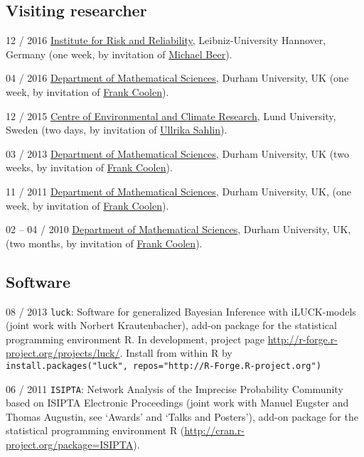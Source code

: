 \documentclass[a4paper]{simplecv}
\begin{document}
\subsection{Visiting researcher}
\begin{topic}
\item[12 / 2016] \href{https://www.irz.uni-hannover.de/}{Institute for Risk and Reliability},
                 Leibniz-University Hannover, Germany (one week, by invitation of \href{http://www.irz.uni-hannover.de/beer.html}{Michael Beer}).
\item[04 / 2016] \href{http://www.dur.ac.uk/mathematical.sciences/}{Department of Mathematical Sciences}, Durham University, UK (one week, by invitation of \href{http://maths.dur.ac.uk/stats/people/fc/fc.html}{Frank Coolen}).
\item[12 / 2015] \href{http://www.cec.lu.se/}{Centre of Environmental and Climate Research},
                 Lund University, Sweden (two days, by invitation of \href{http://www.cec.lu.se/ullrika-sahlin}{Ullrika Sahlin}).
\item[03 / 2013] \href{http://www.dur.ac.uk/mathematical.sciences/}{Department of Mathematical Sciences}, Durham University, UK (two weeks,
                 by invitation of \href{http://maths.dur.ac.uk/stats/people/fc/fc.html}{Frank Coolen}).
\item[11 / 2011] \href{http://www.dur.ac.uk/mathematical.sciences/}{Department of Mathematical Sciences}, Durham University, UK, (one week, 
                 by invitation of \href{http://maths.dur.ac.uk/stats/people/fc/fc.html}{Frank Coolen}).
\item[02 -- 04 / 2010] \href{http://www.dur.ac.uk/mathematical.sciences/}{Department of Mathematical Sciences}, Durham University, UK, (two months,
                 by invitation of \href{http://maths.dur.ac.uk/stats/people/fc/fc.html}{Frank Coolen}).
\end{topic}

\subsection{Software}

\begin{topic}
\item[08 / 2013] \texttt{luck}: Software for generalized Bayesian Inference with iLUCK-models (joint work with Norbert Krautenbacher),
                 add-on package for the statistical programming environment \textsf{R}. In development, project page
                 \url{http://r-forge.r-project.org/projects/luck/}.
                 Install from within \textsf{R} by\\ \texttt{install.packages("luck", repos="http://R-Forge.R-project.org")}
\item[06 / 2011] \texttt{ISIPTA}: Network Analysis of the Imprecise Probability Community based on ISIPTA Electronic Proceedings
                 (joint work with Manuel Eugster and Thomas Augustin, see `Awards' and `Talks and Posters'),
                 add-on package for the statistical programming environment \textsf{R} (\url{http://cran.r-project.org/package=ISIPTA}).
\end{topic}
\end{document}
